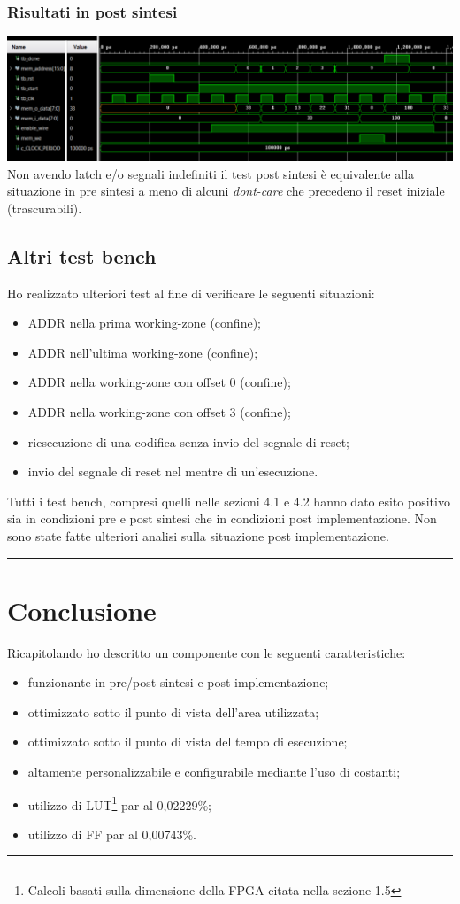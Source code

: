 \documentclass{article}
\begin{document}
\subsubsection{Risultati in post sintesi}
\includegraphics[width=\textwidth]{tb1-ps.png}
Non avendo latch e/o segnali indefiniti il test post sintesi è equivalente alla situazione in pre sintesi a meno di alcuni \textit{dont-care} che precedeno il reset iniziale (trascurabili).
\subsection{Altri test bench}
Ho realizzato ulteriori test al fine di verificare le seguenti situazioni:
\begin{itemize}
	\item ADDR nella prima working-zone (confine);
	\item ADDR nell'ultima working-zone (confine);
	\item ADDR nella working-zone con offset 0 (confine);
	\item ADDR nella working-zone con offset 3 (confine);
	\item riesecuzione di una codifica senza invio del segnale di reset;
	\item invio del segnale di reset nel mentre di un'esecuzione.
\end{itemize}
Tutti i test bench, compresi quelli nelle sezioni 4.1 e 4.2 hanno dato esito positivo sia in condizioni pre e post sintesi che in condizioni post implementazione.
Non sono state fatte ulteriori analisi sulla situazione post implementazione.

\noindent\rule{\textwidth}{0.5pt}
\newpage
\section{Conclusione}
Ricapitolando ho descritto un componente con le seguenti caratteristiche:
\begin{itemize}
	\item funzionante in pre/post sintesi e post implementazione;
	\item ottimizzato sotto il punto di vista dell'area utilizzata;
	\item ottimizzato sotto il punto di vista del tempo di esecuzione;
	\item altamente personalizzabile e configurabile mediante l'uso di costanti;
	\item utilizzo di LUT\footnote{Calcoli basati sulla dimensione della FPGA citata nella sezione 1.5\label{fn}}  par al 0,02229\%;
	\item utilizzo di FF par al 0,00743\%.
\end{itemize}

\noindent\rule{\textwidth}{0.5pt}
\end{document}

